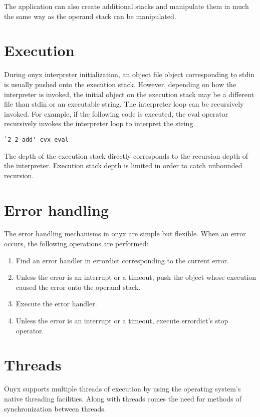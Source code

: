 The application can also create additional stacks and manipulate them in much
the same way as the operand stack can be manipulated.

\section{Execution}

During onyx interpreter initialization, an object file object corresponding to
stdin is usually pushed onto the execution stack.  However, depending on how the
interpreter is invoked, the initial object on the execution stack may be a
different file than stdin or an executable string.  The interpreter loop can be
recursively invoked.  For example, if the following code is executed, the eval
operator recursively invokes the interpreter loop to interpret the string.
\begin{verbatim}
`2 2 add' cvx eval
\end{verbatim}

The depth of the execution stack directly corresponds to the recursion depth of
the interpreter.  Execution stack depth is limited in order to catch unbounded
recursion.

\section{Error handling}

The error handling mechanisms in onyx are simple but flexible.  When an error
occurs, the following operations are performed:
\begin{enumerate}
\item{Find an error handler in errordict corresponding to the current error.}
\item{Unless the error is an interrupt or a timeout, push the object whose
execution caused the error onto the operand stack.}
\item{Execute the error handler.}
\item{Unless the error is an interrupt or a timeout, execute errordict's stop
operator.}
\end{enumerate}

\section{Threads}

Onyx supports multiple threads of execution by using the operating system's
native threading facilities.  Along with threads comes the need for methods of
synchronization between threads.

